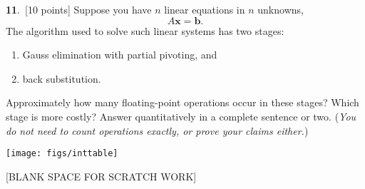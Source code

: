 \documentclass[11pt]{amsart}
\newcommand{\bb}{\mathbf{b}}
\newcommand{\bx}{\mathbf{x}}
\newcommand{\prob}[1]{\bigskip\noindent\large\textbf{#1}.\,\normalsize }
\newcommand{\pts}[1]{\scriptsize [#1 points] \normalsize}
\begin{document}
\prob{11} \pts{10}  Suppose you have $n$ linear equations in $n$ unknowns,
    $$A\bx = \bb.$$
The algorithm used to solve such linear systems has two stages:
\begin{enumerate}
\item Gauss elimination with partial pivoting, and
\item back substitution.
\end{enumerate}
Approximately how many floating-point operations occur in these stages?  Which stage is more costly?  Answer quantitatively in a complete sentence or two.  (\emph{You do not need to count operations exactly, or prove your claims either.})
\vspace{2.5in}


\newpage
\begin{center}
\texttt{[image: figs/inttable]}
\bigskip


[BLANK SPACE FOR SCRATCH WORK]
\end{center}
\thispagestyle{empty}
\vfill
\end{document}

